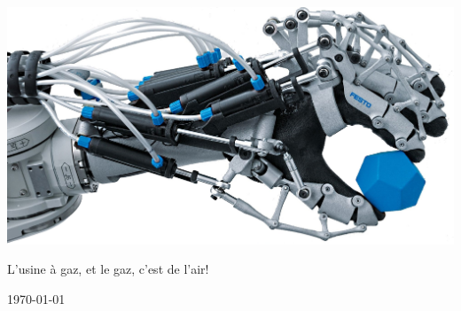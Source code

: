 \documentclass[10pt,a4paper,final]{article}
\begin{document}
\begin{center}
\begin{multicols}{2}
\begin{flushright}
\end{flushright}
\end{multicols}

\bigskip
\bigskip


\includegraphics[scale=0.6]{Figures/Picture_for_Title.jpg} 

\vfill
L'usine à gaz, et le gaz, c'est de l'air!
\bigskip

{\large \today}
\end{center}






\pagebreak
\begin{spacing}{1.24999}
\tableofcontents 
\listoffigures  
\listoftables 
\end{spacing}  
\pagebreak






\renewcommand\headrulewidth{1pt}
\end{document}
